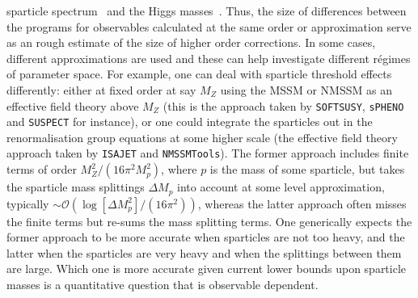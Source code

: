 \documentclass[final,3p,times]{elsarticle}
\def\code#1{{\tt #1}}
\begin{document}
sparticle spectrum~\cite{Allanach:2003jw} and the Higgs
masses~\cite{Allanach:2004rh,Staub:2015aea,deFlorian:2016spz}. Thus, the size of
differences between the programs for observables calculated at the same order
or approximation serve as an rough estimate of the size of higher order
corrections. In some cases, different approximations are used and these can
help investigate different r\'{e}gimes of parameter space. For example, one
can deal with sparticle threshold effects differently: either at fixed order
at say $M_Z$ using the MSSM or NMSSM as an effective field theory above $M_Z$
(this is the approach taken by \code{SOFTSUSY}, \code{sPHENO} and
\code{SUSPECT} for instance), or one could integrate the sparticles out in the
renormalisation group equations at some higher scale (the effective field theory approach taken by 
\code{ISAJET} and \code{NMSSMTools}). The former approach includes finite
terms of order $M_Z^2/(16 \pi^2 M_p^2)$, where $p$ is the mass of some
sparticle, but takes the sparticle mass splittings $\Delta M_p$ into account
at some level approximation, typically $\sim {\mathcal O}\left(\log [\Delta M_p^2] / (16 \pi^2)\right)$,
whereas the latter 
approach often misses the finite terms but re-sums the mass splitting terms. 
One generically expects the former approach to be more accurate when
sparticles are not too heavy, and the latter when the sparticles are very
heavy and when the splittings between them are large. Which one is more
accurate given current lower bounds upon sparticle masses is a quantitative
question that is observable dependent. 
\end{document}
